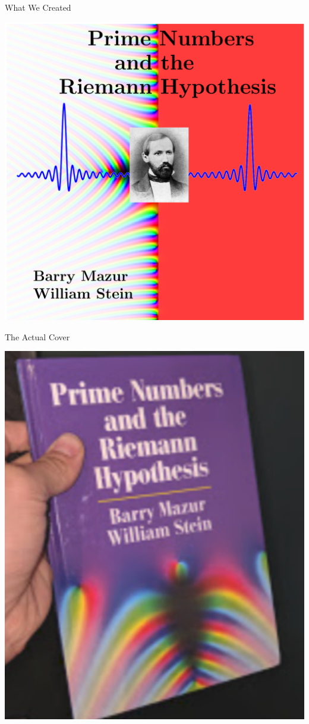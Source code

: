 \documentclass{beamer}
\begin{document}
\begin{frame}{What We Created}
  \begin{center}
    \includegraphics[height=.82\textheight]{pics/cover-we-wanted}
  \end{center}
\end{frame}

\begin{frame}{The Actual Cover}
  \begin{center}
    \includegraphics[height=.82\textheight]{pics/cover-front}
  \end{center}
\end{frame}
\end{document}

